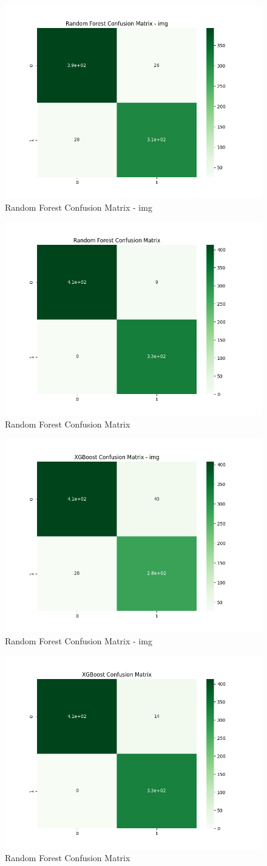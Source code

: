\documentclass{article}
\begin{document}
\begin{multicols}{2}
\begin{figure}[H]
    \centering
    \includegraphics[width = .48\textwidth]{confusion/RF-confusion-img.png}
    \caption{Random Forest Confusion Matrix - img}
    \label{fig:enter-label}
\end{figure}

\begin{figure}[H]
    \centering
    \includegraphics[width = .48\textwidth]{confusion/RF-confusion.png}
    \caption{Random Forest Confusion Matrix}
    \label{fig:enter-label}
\end{figure}

\begin{figure}[H]
    \centering
    \includegraphics[width = .48\textwidth]{confusion/xgb-confusion-img.png}
    \caption{Random Forest Confusion Matrix - img}
    \label{fig:enter-label}
\end{figure}

\begin{figure}[H]
    \centering
    \includegraphics[width = .48\textwidth]{confusion/xgb-confusion.png}
    \caption{Random Forest Confusion Matrix}
    \label{fig:enter-label}
\end{figure}

\end{multicols}





\end{document}
